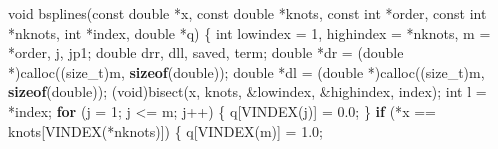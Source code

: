 \documentclass[
  12pt,
  letterpaper,
  DIV=11,
  numbers=noendperiod]{scrreprt}
\newenvironment{Shaded}{\begin{snugshade}}{\end{snugshade}}
\newcommand{\ControlFlowTok}[1]{\textcolor[rgb]{0.00,0.23,0.31}{\textbf{#1}}}
\newcommand{\DataTypeTok}[1]{\textcolor[rgb]{0.68,0.00,0.00}{#1}}
\newcommand{\DecValTok}[1]{\textcolor[rgb]{0.68,0.00,0.00}{#1}}
\newcommand{\FloatTok}[1]{\textcolor[rgb]{0.68,0.00,0.00}{#1}}
\newcommand{\KeywordTok}[1]{\textcolor[rgb]{0.00,0.23,0.31}{\textbf{#1}}}
\newcommand{\NormalTok}[1]{\textcolor[rgb]{0.00,0.23,0.31}{#1}}
\newcommand{\OperatorTok}[1]{\textcolor[rgb]{0.37,0.37,0.37}{#1}}
\theoremstyle{remark}
\begin{document}
\begin{Shaded}
\begin{Highlighting}[]
\DataTypeTok{void}\NormalTok{ bsplines}\OperatorTok{(}\DataTypeTok{const} \DataTypeTok{double} \OperatorTok{*}\NormalTok{x}\OperatorTok{,} \DataTypeTok{const} \DataTypeTok{double} \OperatorTok{*}\NormalTok{knots}\OperatorTok{,} \DataTypeTok{const} \DataTypeTok{int} \OperatorTok{*}\NormalTok{order}\OperatorTok{,}
              \DataTypeTok{const} \DataTypeTok{int} \OperatorTok{*}\NormalTok{nknots}\OperatorTok{,} \DataTypeTok{int} \OperatorTok{*}\NormalTok{index}\OperatorTok{,} \DataTypeTok{double} \OperatorTok{*}\NormalTok{q}\OperatorTok{)} \OperatorTok{\{}
    \DataTypeTok{int}\NormalTok{ lowindex }\OperatorTok{=} \DecValTok{1}\OperatorTok{,}\NormalTok{ highindex }\OperatorTok{=} \OperatorTok{*}\NormalTok{nknots}\OperatorTok{,}\NormalTok{ m }\OperatorTok{=} \OperatorTok{*}\NormalTok{order}\OperatorTok{,}\NormalTok{ j}\OperatorTok{,}\NormalTok{ jp1}\OperatorTok{;}
    \DataTypeTok{double}\NormalTok{ drr}\OperatorTok{,}\NormalTok{ dll}\OperatorTok{,}\NormalTok{ saved}\OperatorTok{,}\NormalTok{ term}\OperatorTok{;}
    \DataTypeTok{double} \OperatorTok{*}\NormalTok{dr }\OperatorTok{=} \OperatorTok{(}\DataTypeTok{double} \OperatorTok{*)}\NormalTok{calloc}\OperatorTok{((}\DataTypeTok{size\_t}\OperatorTok{)}\NormalTok{m}\OperatorTok{,} \KeywordTok{sizeof}\OperatorTok{(}\DataTypeTok{double}\OperatorTok{));}
    \DataTypeTok{double} \OperatorTok{*}\NormalTok{dl }\OperatorTok{=} \OperatorTok{(}\DataTypeTok{double} \OperatorTok{*)}\NormalTok{calloc}\OperatorTok{((}\DataTypeTok{size\_t}\OperatorTok{)}\NormalTok{m}\OperatorTok{,} \KeywordTok{sizeof}\OperatorTok{(}\DataTypeTok{double}\OperatorTok{));}
    \OperatorTok{(}\DataTypeTok{void}\OperatorTok{)}\NormalTok{bisect}\OperatorTok{(}\NormalTok{x}\OperatorTok{,}\NormalTok{ knots}\OperatorTok{,} \OperatorTok{\&}\NormalTok{lowindex}\OperatorTok{,} \OperatorTok{\&}\NormalTok{highindex}\OperatorTok{,}\NormalTok{ index}\OperatorTok{);}
    \DataTypeTok{int}\NormalTok{ l }\OperatorTok{=} \OperatorTok{*}\NormalTok{index}\OperatorTok{;}
    \ControlFlowTok{for} \OperatorTok{(}\NormalTok{j }\OperatorTok{=} \DecValTok{1}\OperatorTok{;}\NormalTok{ j }\OperatorTok{\textless{}=}\NormalTok{ m}\OperatorTok{;}\NormalTok{ j}\OperatorTok{++)} \OperatorTok{\{}
\NormalTok{        q}\OperatorTok{[}\NormalTok{VINDEX}\OperatorTok{(}\NormalTok{j}\OperatorTok{)]} \OperatorTok{=} \FloatTok{0.0}\OperatorTok{;}
    \OperatorTok{\}}
    \ControlFlowTok{if} \OperatorTok{(*}\NormalTok{x }\OperatorTok{==}\NormalTok{ knots}\OperatorTok{[}\NormalTok{VINDEX}\OperatorTok{(*}\NormalTok{nknots}\OperatorTok{)])} \OperatorTok{\{}
\NormalTok{        q}\OperatorTok{[}\NormalTok{VINDEX}\OperatorTok{(}\NormalTok{m}\OperatorTok{)]} \OperatorTok{=} \FloatTok{1.0}\OperatorTok{;}

\end{Highlighting}
\end{Shaded}
\end{document}
